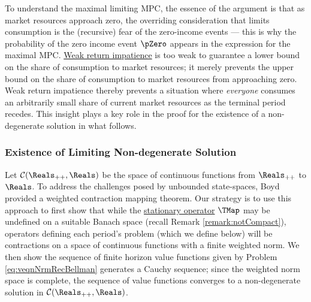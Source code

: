 \documentclass[BufferStockTheory]{subfiles}
\begin{document}
To understand the maximal limiting MPC, the essence of the argument is that as market resources approach zero, the overriding consideration that limits consumption is the (recursive) fear of the zero-income events --- this is why the probability of the zero income event $\pZero$ appears in the expression for the maximal MPC.
\hyperlink{WRIC}{Weak return impatience} is too weak to guarantee a lower bound on the share of consumption to market resources; it merely prevents the upper bound on the share of consumption to market resources from approaching zero.
Weak return impatience thereby prevents a situation where \textit{everyone} consumes an arbitrarily small share of current market resources as the terminal period recedes.
This insight plays a key role in the proof for the existence of a non-degenerate solution in what follows.

\hypertarget{Conditions-Under-Which-the-Problem-Defines-a-Contraction-Mapping}{}
\subsubsection{Existence of Limiting Non-degenerate Solution}\label{subsubsec:eventuallyCauchy}

Let $\mathcal{C}(\Reals_{++},\Reals)$ be the space of continuous functions from $\Reals_{++}$ to $\Reals$.
To address the challenges posed by unbounded state-spaces, Boyd~\citeyearpar{jboydWeighted} provided a weighted contraction mapping theorem.
Our strategy is to use this approach to first show that while the \hyperlink{Stationary-Bellman-Operator}{stationary operator} $\TMap$ may be undefined on a suitable Banach space (recall Remark \ref{remark:notCompact}), operators defining each period's problem (which we define below) will be contractions on a space of continuous functions with a finite weighted norm.
We then show the sequence of finite horizon value functions given by Problem \eqref{eq:veqnNrmRecBellman} generates a Cauchy sequence; since the weighted norm space is complete, the sequence of value functions converges to a non-degenerate solution in $\mathcal{C}(\Reals_{++},\Reals)$.
\end{document}
